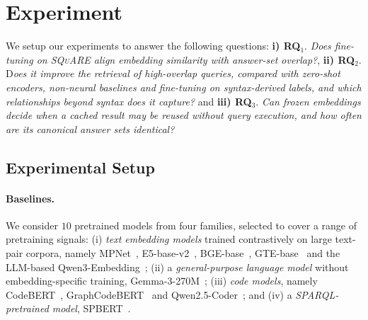 \documentclass[runningheads]{llncs}
\newcommand{\squareds}{\textsc{SQuARE}}
\begin{document}
\section{Experiment}
\label{sec:exp}

We setup our experiments to answer the following questions: \textbf{i) RQ}$_1$.\textit{ Does fine-tuning on \squareds{} align embedding similarity with answer-set overlap?}, \textbf{ii) RQ}$_2$. D\textit{oes it improve the retrieval of high-overlap queries, compared with zero-shot encoders, non-neural baselines and fine-tuning on syntax-derived labels, and which relationships beyond syntax does it capture?} and \textbf{iii) RQ}$_3$. \textit{Can frozen embeddings decide when a cached result may be reused without query execution, and how often are its canonical answer sets identical?}

\subsection{Experimental Setup}
\label{sec:setup}

\paragraph{Baselines.}
We consider $10$ pretrained models from four families, selected to cover a
range of pretraining signals:
(i) \emph{text embedding models} trained contrastively on large text-pair
corpora, namely MPNet~\cite{song2020mpnet}, E5-base-v2~\cite{wang2022e5},
BGE-base~\cite{xiao2024bge}, GTE-base~\cite{li2023gte} and the LLM-based
Qwen3-Embedding~\cite{zhang2025qwen3emb};
(ii) a \emph{general-purpose language model} without embedding-specific
training, Gemma-3-270M~\cite{gemmateam2025gemma3};
(iii) \emph{code models}, namely CodeBERT~\cite{feng2020codebert},
GraphCodeBERT~\cite{guo2021graphcodebert} and
Qwen2.5-Coder~\cite{hui2024qwen25coder}; and
(iv) a \emph{SPARQL-pretrained model}, SPBERT~\cite{tran2021spbert}.
\end{document}
